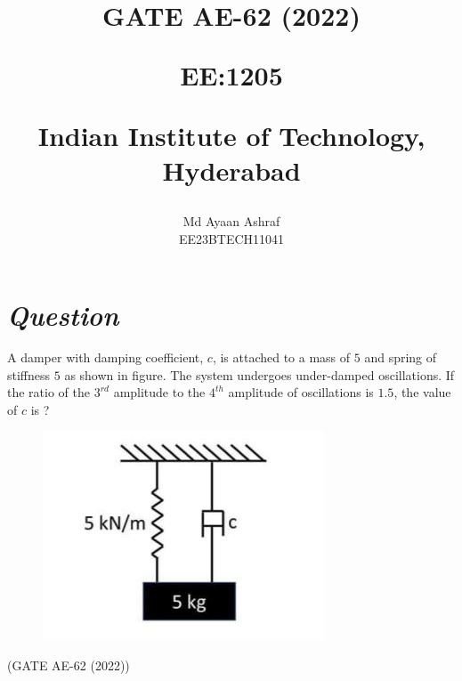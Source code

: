 \documentclass[journal,12pt,twocolumn]{IEEEtran}
\theoremstyle{remark}
\begin{document}
%




\vspace{3cm}

\title{
GATE AE-62 (2022)

\large{EE:1205 }

Indian Institute of Technology, Hyderabad
}
\author{Md Ayaan Ashraf

EE23BTECH11041
}  
\maketitle
\newpage
\bigskip
\renewcommand{\thefigure}{\arabic{figure}}
\renewcommand{\thetable}{\arabic{table}}
\section*{\textit{\textbf{Question}}}
A damper with damping coefficient, $c$, is attached to a mass of $5$  and spring of stiffness  $5$  as shown in figure. The system undergoes under-damped oscillations.
If the ratio of the $3^{rd}$ amplitude to the $4^{th}$ amplitude of oscillations is ${1.5}$, the value of $c$ is ?
\begin{figure}[ht]
    \centering
    \includegraphics[width=\columnwidth]{2022/AE/62/figs/fig1.png}
\end{figure}

\hfill {(GATE AE-62 (2022))}
\end{document}
